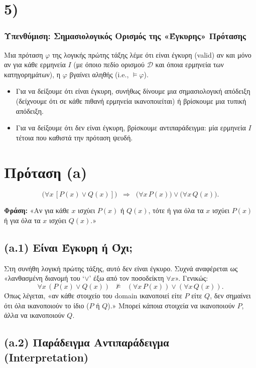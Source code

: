 \documentclass[a4paper,12pt]{article}
\begin{document}
\section*{5)}

\subsubsection*{Υπενθύμιση: Σημασιολογικός Ορισμός της «Έγκυρης» Πρότασης}

Μια πρόταση \(\varphi\) της λογικής πρώτης τάξης λέμε ότι είναι έγκυρη (valid) αν και μόνο αν για κάθε ερμηνεία \(I\) (με όποιο πεδίο ορισμού \(\mathcal{D}\) και όποια ερμηνεία των κατηγορημάτων), η \(\varphi\) βγαίνει αληθής (i.e., \(\models \varphi\)).
\begin{itemize}
    \item Για να δείξουμε ότι είναι έγκυρη, συνήθως δίνουμε μια σημασιολογική απόδειξη (δείχνουμε ότι σε κάθε πιθανή ερμηνεία ικανοποιείται) ή βρίσκουμε μια τυπική απόδειξη.
    \item Για να δείξουμε ότι δεν είναι έγκυρη, βρίσκουμε αντιπαράδειγμα: μία ερμηνεία \(I\) τέτοια που καθιστά την πρόταση ψευδή.
\end{itemize}

\section*{Πρόταση (a)}

\[
\bigl(\forall x\,[P(x)\lor Q(x)]\bigr) \;\;\Rightarrow\;\; \bigl(\forall x\,P(x)\bigr)\lor\bigl(\forall x\,Q(x)\bigr).
\]

\textbf{Φράση:} «Αν για κάθε \(x\) ισχύει \(P(x)\) ή \(Q(x)\), τότε ή για όλα τα \(x\) ισχύει \(P(x)\) ή για όλα τα \(x\) ισχύει \(Q(x)\).»

\subsection*{(a.1) Είναι Έγκυρη ή Όχι;}

Στη συνήθη λογική πρώτης τάξης, αυτό δεν είναι έγκυρο. Συχνά αναφέρεται ως «λανθασμένη διανομή του ‘\(\lor\)’ έξω από τον ποσοδείκτη \(\forall x\)». Γενικώς:
\[
\forall x\,(P(x)\lor Q(x)) \;\;\not\models\;\; (\forall x\,P(x))\lor (\forall x\,Q(x)).
\]
Όπως λέγεται, «αν κάθε στοιχείο του domain ικανοποιεί είτε \(P\) είτε \(Q\), δεν σημαίνει ότι όλα ικανοποιούν το ίδιο (\(P\) ή \(Q\)).» Μπορεί κάποια στοιχεία να ικανοποιούν \(P\), άλλα να ικανοποιούν \(Q\).

\subsection*{(a.2) Παράδειγμα Αντιπαράδειγμα (Interpretation)}
\end{document}
